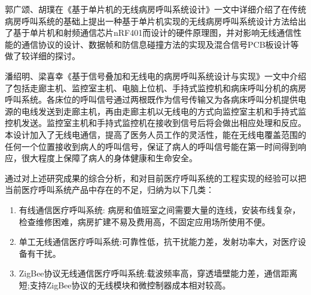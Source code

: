 郭{\cf}广颂{\cf}、胡{\cf}璞在{\cf}《基{\cf}于单{\cf}片机{\cf}的无{\cf}线病{\cf}房呼{\cf}叫系{\cf}统设{\cf}计》{\cf}一文{\cf}中详{\cf}细介{\cf}绍了{\cf}在传{\cf}统病{\cf}房呼{\cf}叫系{\cf}统的{\cf}基础{\cf}上提{\cf}出一{\cf}种基{\cf}于单{\cf}片机{\cf}实现{\cf}的无{\cf}线病{\cf}房呼{\cf}叫系{\cf}统设{\cf}计方{\cf}法给{\cf}出了{\cf}基于{\cf}单片{\cf}机和{\cf}射频{\cf}通信{\cf}芯片{\cf}nR{\cf}F4{\cf}01{\cf}而设{\cf}计的{\cf}硬件{\cf}原理{\cf}图，{\cf}并对{\cf}影响{\cf}无线{\cf}通信{\cf}性能{\cf}的通{\cf}信协{\cf}议的{\cf}设计{\cf}、数{\cf}据帧{\cf}和防{\cf}信息{\cf}碰撞{\cf}方法{\cf}的实{\cf}现及{\cf}混合{\cf}信号{\cf}PC{\cf}B板{\cf}设计{\cf}等做{\cf}了较{\cf}详细{\cf}的探讨。

潘{\cf}绍明{\cf}、梁{\cf}喜幸{\cf}《基{\cf}于信{\cf}号叠{\cf}加和{\cf}无线{\cf}电的{\cf}病房{\cf}呼叫{\cf}系统{\cf}设计{\cf}与实{\cf}现》{\cf}一文{\cf}中介{\cf}绍了{\cf}包括{\cf}走廊{\cf}主机{\cf}、监{\cf}控室{\cf}主机{\cf}、电{\cf}脑上{\cf}位机{\cf}、手{\cf}持式{\cf}监控{\cf}机和{\cf}病床{\cf}呼叫{\cf}分机{\cf}的病{\cf}房呼{\cf}叫系{\cf}统。{\cf}各床{\cf}位的{\cf}呼叫{\cf}信号{\cf}通过{\cf}两根{\cf}既作{\cf}为信{\cf}号传{\cf}输又{\cf}为各{\cf}病床{\cf}呼叫{\cf}分机{\cf}提供{\cf}电源{\cf}的电{\cf}线发{\cf}送到{\cf}走廊{\cf}主机{\cf}，再{\cf}由走{\cf}廊主{\cf}机以{\cf}无线{\cf}电的{\cf}方式{\cf}向监{\cf}控室{\cf}主机{\cf}和手{\cf}持式{\cf}监控{\cf}机发{\cf}送。{\cf}监控{\cf}室主{\cf}机和{\cf}手持{\cf}式监{\cf}控机{\cf}在接{\cf}收到{\cf}信号{\cf}后将{\cf}会做{\cf}出相{\cf}应处{\cf}理和{\cf}反应{\cf}。本{\cf}设计{\cf}加入{\cf}了无{\cf}线电{\cf}通信{\cf}，提{\cf}高了{\cf}医务{\cf}人员{\cf}工作{\cf}的灵{\cf}活性{\cf}，能{\cf}在无{\cf}线电{\cf}覆盖{\cf}范围{\cf}的任{\cf}何一{\cf}个位{\cf}置接{\cf}收到{\cf}病人{\cf}的呼{\cf}叫信{\cf}号，{\cf}保证{\cf}了病{\cf}人的{\cf}呼叫{\cf}信号{\cf}能在{\cf}第一{\cf}时间{\cf}得到{\cf}响应{\cf}，很{\cf}大程{\cf}度上{\cf}保障{\cf}了病{\cf}人的{\cf}身体{\cf}健康{\cf}和生{\cf}命安全。

通{\cf}过对{\cf}上述{\cf}研究{\cf}成果{\cf}的综{\cf}合分{\cf}析，{\cf}和对{\cf}目前{\cf}医疗{\cf}呼叫{\cf}系统{\cf}的工{\cf}程实{\cf}现的{\cf}经验{\cf}可以{\cf}把当{\cf}前医{\cf}疗呼{\cf}叫系{\cf}统产{\cf}品中{\cf}存在{\cf}的不{\cf}足，{\cf}归纳{\cf}为以{\cf}下几{\cf}类：
\begin{enumerate}
   \item 有{\cf}线通{\cf}信医{\cf}疗呼{\cf}叫系{\cf}统: {\cf}病房{\cf}和值{\cf}班室{\cf}之间{\cf}需要{\cf}大量{\cf}的连{\cf}线，{\cf}安装{\cf}布线{\cf}复杂{\cf}，检{\cf}查维{\cf}修困{\cf}难，{\cf}病房{\cf}扩建{\cf}不易{\cf}及费{\cf}用高{\cf}，不{\cf}固定{\cf}应用{\cf}场所{\cf}使用{\cf}不便{\cf}。
   \item 单{\cf}工无{\cf}线通{\cf}信医{\cf}疗呼{\cf}叫系{\cf}统:{\cf}可靠{\cf}性低{\cf}，抗{\cf}干扰{\cf}能力{\cf}差，{\cf}发射{\cf}功率{\cf}大，{\cf}对医{\cf}疗设{\cf}备有干扰。
   \item ZigBee协{\cf}议无{\cf}线通{\cf}信医{\cf}疗呼{\cf}叫系{\cf}统:{\cf}载波{\cf}频率{\cf}高，{\cf}穿透{\cf}墙壁{\cf}能力{\cf}差，{\cf}通信{\cf}距离{\cf}短;{\cf}支持{\cf}Zi{\cf}gB{\cf}ee{\cf}协议{\cf}的无{\cf}线模{\cf}块和{\cf}微控{\cf}制器{\cf}成本{\cf}相对较高。
\end{enumerate}

